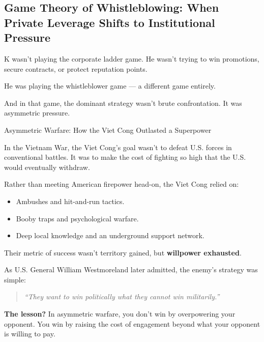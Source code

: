 \subsection{Game Theory of Whistleblowing: When Private Leverage Shifts to Institutional Pressure}

K wasn’t playing the corporate ladder game.  
He wasn’t trying to win promotions, secure contracts, or protect reputation points.

He was playing the whistleblower game — a different game entirely.

And in that game, the dominant strategy wasn’t brute confrontation.  
It was asymmetric pressure.

\medskip

\begin{HistoricalSidebar}{Asymmetric Warfare: How the Viet Cong Outlasted a Superpower}

In the Vietnam War, the Viet Cong’s goal wasn’t to defeat U.S. forces in conventional battles.  
It was to make the cost of fighting so high that the U.S. would eventually withdraw.

\medskip

Rather than meeting American firepower head-on, the Viet Cong relied on:

\begin{itemize}
    \item Ambushes and hit-and-run tactics.
    \item Booby traps and psychological warfare.
    \item Deep local knowledge and an underground support network.
\end{itemize}

Their metric of success wasn’t territory gained, but \textbf{willpower exhausted}.

\medskip

As U.S. General William Westmoreland later admitted, the enemy’s strategy was simple:

\begin{quote}
    \textit{``They want to win politically what they cannot win militarily.''}
\end{quote}

\textbf{The lesson?} In asymmetric warfare, you don’t win by overpowering your opponent.  
You win by raising the cost of engagement beyond what your opponent is willing to pay.

\end{HistoricalSidebar}

